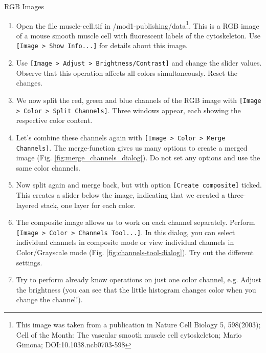 \begin{taskbox}{RGB Images}

\begin{enumerate}
	\item Open the file muscle-cell.tif in /mod1-publishing/data\footnote{This image was taken from a publication in Nature Cell Biology 5, 598(2003); Cell of the Month: The vascular smooth muscle cell cytoskeleton; Mario Gimona; DOI:10.1038.ncb0703-598}. This is a RGB image of a mouse smooth muscle cell with fluorescent labels of the cytoskeleton. Use \texttt{[Image > Show Info...]} for details about this image.
	\item Use \texttt{[Image > Adjust > Brightness/Contrast]} and change the slider values. Observe that this operation affects all colors simultaneously. Reset the changes.
	\item We now split the red, green and blue channels of the RGB image with \texttt{[Image > Color > Split Channels]}. Three windows appear, each showing the respective color content. 
	\item Let's combine these channels again with \texttt{[Image > Color > Merge Channels]}. The merge-function gives us many options to create a merged image (Fig. \ref{fig:merge_channels_dialog}). Do not set any options and use the same color channels.
	
	\begin{minipage}[t]{\linewidth}
		\begin{center}
		\medskip
		\label{fig:merge-channels-dialog}
		\end{center}
	\end{minipage}
	
	\item Now split again and merge back, but with option \texttt{[Create composite]} ticked. This creates a slider below the image, indicating that we created a three-layered stack, one layer for each color.  
	\item The composite image allows us to work on each channel separately. Perform \texttt{[Image > Color > Channels Tool...]}. In this dialog, you can select individual channels in composite mode or view individual channels in Color/Grayscale mode (Fig. \ref{fig:channels-tool-dialog}). Try out the different settings.
	
		\begin{minipage}[t]{\linewidth}
		\begin{center}
		\medskip
		\label{fig:channels-tool-dialog}
		\end{center}
	\end{minipage}
	
	\item Try to perform already know operations on just one color channel, e.g. Adjust the brightness (you can see that the little histogram changes color when you change the channel!).
\end{enumerate}

\end{taskbox}

